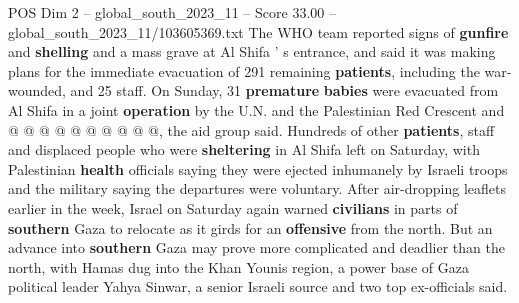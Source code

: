\begin{textsample}{POS Dim 2 – global\_south\_2023\_11 – Score 33.00 – global\_south\_2023\_11/103605369.txt}
The WHO team reported signs of \textbf{gunfire} and \textbf{shelling} and a mass grave at Al Shifa ' s entrance, and said it was making plans for the immediate evacuation of 291 remaining \textbf{patients}, including the war-wounded, and 25 staff.
On Sunday, 31 \textbf{premature} \textbf{babies} were evacuated from Al Shifa in a joint \textbf{operation} by the U.N. and the Palestinian Red Crescent and @ @ @ @ @ @ @ @ @ @, the aid group said.
Hundreds of other \textbf{patients}, staff and displaced people who were \textbf{sheltering} in Al Shifa left on Saturday, with Palestinian \textbf{health} officials saying they were ejected inhumanely by Israeli troops and the military saying the departures were voluntary.
After air-dropping leaflets earlier in the week, Israel on Saturday again warned \textbf{civilians} in parts of \textbf{southern} Gaza to relocate as it girds for an \textbf{offensive} from the north.
But an advance into \textbf{southern} Gaza may prove more complicated and deadlier than the north, with Hamas dug into the Khan Younis region, a power base of Gaza political leader Yahya Sinwar, a senior Israeli source and two top ex-officials said.

\end{textsample}
